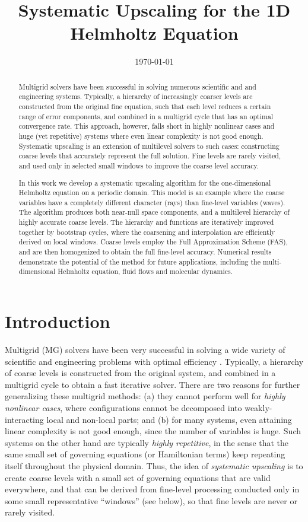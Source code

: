 \documentclass{article}
\title{Systematic Upscaling for the 1D Helmholtz Equation}
\author{}
\date{\today}
\begin{document}
\maketitle

\begin{abstract}
Multigrid solvers have been successful in solving numerous scientific and and engineering systems. Typically, a hierarchy of increasingly coarser levels are constructed from the original fine equation, such that each level reduces a certain range of error components, and combined in a multigrid cycle that has an optimal convergence rate. This approach, however, falls short in highly nonlinear cases and huge (yet repetitive) systems where even linear complexity is not good enough. Systematic upscaling is an extension of multilevel solvers to such cases: constructing coarse levels that accurately represent the full solution. Fine levels are rarely visited, and used only in selected small windows to improve the coarse level accuracy.

In this work we develop a systematic upscaling algorithm for the one-dimensional Helmholtz equation on a periodic domain. This model is an example where the coarse variables have a completely different character (rays) than fine-level variables (waves). The algorithm produces both near-null space components, and a multilevel hierarchy of highly accurate coarse levels. The hierarchy and functions are iteratively improved together by bootstrap cycles, where the coarsening and interpolation are efficiently derived on local windows. Coarse levels employ the Full Approximation Scheme (FAS), and are then homogenized to obtain the full fine-level accuracy. Numerical results demonstrate the potential of the method for future applications, including the multi-dimensional Helmholtz equation, fluid flows and molecular dynamics.
\end{abstract}

\section{Introduction}
\label{intro}
Multigrid (MG) solvers have been very successful in solving a wide variety of scientific and engineering problems with optimal efficiency \cite{review}. Typically, a hierarchy of coarse levels is constructed from the original system, and combined in a multigrid cycle to obtain a fast iterative solver. There are two reasons for further generalizing these multigrid methods: (a) they cannot perform well for \emph{highly nonlinear cases}, where configurations cannot be decomposed into weakly-interacting local and non-local parts; and (b) for many systems, even attaining linear complexity is not good enough, since the number of variables is huge. Such systems on the other hand are typically \emph{highly repetitive}, in the sense that the same small set of governing equations (or Hamiltonian terms) keep repeating itself throughout the physical domain. Thus, the idea of \emph{systematic upscaling}  \cite{su} is to create coarse levels with  a small set of governing equations that are valid everywhere, and that can be derived from fine-level processing conducted only in some small representative “windows” (see below), so that fine levels are never or rarely visited.
\end{document}
